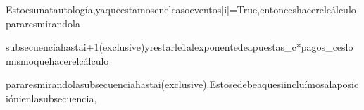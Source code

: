{Esto\hspace{3}es\hspace{3}una\hspace{3}tautolog\'ia,\hspace{3}ya\hspace{3}que\hspace{3}estamos\hspace{3}en\hspace{3}el\hspace{3}caso\hspace{3}eventos[i]=True,\hspace{3}entonces\hspace{3}hacer\hspace{3}el\hspace{3}c\'alculo\hspace{3}para\hspace{3}res\hspace{3}mirando\hspace{3}la
\vspace{0.1cm}

subsecuencia\hspace{3}hasta\hspace{3}i+1\hspace{3}(exclusive)\hspace{3}y\hspace{3}restarle\hspace{3}1\hspace{3}al\hspace{3}exponente\hspace{3}de\hspace{3}apuestas_c*pagos_c\hspace{3}es\hspace{3}lo\hspace{3}mismo\hspace{3}que\hspace{3}hacer\hspace{3}el\hspace{3}c\'alculo
\vspace{0.1cm}

para\hspace{3}res\hspace{3}mirando\hspace{3}la\hspace{3}subsecuencia\hspace{3}hasta\hspace{3}i\hspace{3}(exclusive).\hspace{3}Esto\hspace{3}se\hspace{3}debe\hspace{3}a\hspace{3}que\hspace{3}si\hspace{3}inclu\'imos\hspace{3}a\hspace{3}la\hspace{3}posici\'on\hspace{3}i\hspace{3}en\hspace{3}la\hspace{3}subsecuencia,
\vspace{0.1cm}

}
